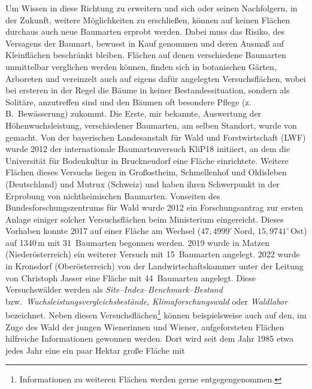 \documentclass[twocolumn]{scrartcl}
\begin{document}
Um Wissen in diese Richtung zu erweitern und sich oder seinen Nachfolgern, in
der Zukunft, weitere Möglichkeiten zu erschließen, können auf keinen Flächen
durchaus auch neue Baumarten erprobt werden. Dabei muss das Risiko, des
Versagens der Baumart, bewusst in Kauf genommen und deren Ausmaß auf
Kleinflächen beschränkt bleiben. Flächen auf denen verschiedene Baumarten
unmittelbar verglichen werden können, finden sich in botanischen Gärten,
Arboreten und vereinzelt auch auf eigens dafür angelegten Versuchsflächen, wobei
bei ersteren in der Regel die Bäume in keiner Bestandessituation, sondern als
Solitäre, anzutreffen sind und den Bäumen oft besondere Pflege (z.\,B.\
Bewässerung) zukommt. Die Erste, mir bekannte, Auswertung der
Höhenwuchsleistung, verschiedener Baumarten, am selben Standort, wurde von
\cite{mayer1970anbauversuch} gemacht. Von der bayerischen Landesanstalt für Wald
und Forstwirtschaft (LWF) wurde 2012 der internationale Baumartenversuch KliP18
initiiert, an dem die Universität für Bodenkultur in Bruckneudorf eine Fläche
einrichtete. Weitere Flächen dieses Versuchs liegen in Großostheim, Schmellenhof
und Oldisleben (Deutschland) und Mutrux (Schweiz) und haben ihren Schwerpunkt in
der Erprobung von nichtheimischen Baumarten. Vonseiten des
Bundesforschungszentrums für Wald wurde 2012 ein Forschungsantrag zur ersten
Anlage einiger solcher Versuchsflächen beim Ministerium eingereicht. Dieses
Vorhaben konnte 2017 auf einer Fläche am Wechsel ($47,4999^{\circ}$\,Nord,
$15,9741^{\circ}$\,Ost) auf 1340\,m mit 31~Baumarten begonnen werden. 2019 wurde
in Matzen (Niederösterreich) ein weiterer Versuch mit 15~Baumarten angelegt.
2022 wurde in Kronsdorf (Oberösterreich) von der Landwirtschaftskammer unter der
Leitung von Christoph Jasser eine Fläche mit 44~Baumarten angelegt. Diese
Versuchswälder werden als \emph{Site--Index--Benchmark--Bestand} bzw.\
\emph{Wuchsleistungsvergleichsbestände}, \emph{Klimaforschungswald} oder
\emph{Waldlabor} bezeichnet. Neben diesen Versuchsflächen\footnote{Informationen
zu weiteren Flächen werden gerne entgegengenommen.} können beispielsweise auch
auf den, im Zuge des \glqq{}Wald der jungen Wienerinnen und Wiener\grqq{},
aufgeforsteten Flächen hilfreiche Informationen gewonnen werden. Dort wird seit
dem Jahr 1985 etwa jedes Jahr eine ein paar Hektar große Fläche mit
\end{document}
